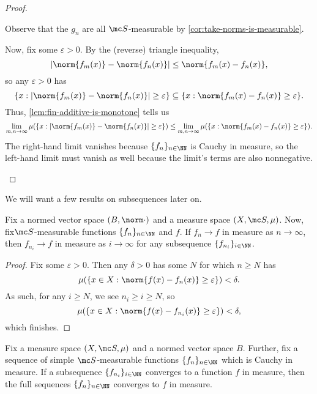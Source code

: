 \documentclass[../notes.tex]{subfiles}
\begin{document}
\begin{proof}
\begin{listalph}
		\item Observe that the $g_n$ are all $\mc S$-measurable by \autoref{cor:take-norms-is-measurable}.

		Now, fix some $\varepsilon>0$. By the (reverse) triangle inequality,
		\[|\norm{f_m(x)}-\norm{f_n(x)}|\le\norm{f_m(x)-f_n(x)},\]
		so any $\varepsilon>0$ has
		\[\{x:|\norm{f_m(x)}-\norm{f_n(x)}|\ge\varepsilon\}\subseteq\{x:\norm{f_m(x)-f_n(x)}\ge\varepsilon\}.\]
		Thus, \autoref{lem:fin-additive-is-monotone} tells us
		\[\lim_{m,n\to\infty}\mu(\{x:|\norm{f_m(x)}-\norm{f_n(x)}|\ge\varepsilon\})\le\lim_{m,n\to\infty}\mu(\{x:\norm{f_m(x)-f_n(x)}\ge\varepsilon\}).\]
		The right-hand limit vanishes because $\{f_n\}_{n\in\NN}$ is Cauchy in measure, so the left-hand limit must vanish as well because the limit's terms are also nonnegative.
		\qedhere
	\end{listalph}
\end{proof}
We will want a few results on subsequences later on.
\begin{lemma} \label{lem:in-measure-subsequence}
	Fix a normed vector space $(B,\norm\cdot)$ and a measure space $(X,\mc S,\mu)$. Now, fix$\mc S$-measurable functions $\{f_n\}_{n\in\NN}$ and $f$. If $f_n\to f$ in measure as $n\to\infty$, then $f_{n_i}\to f$ in measure as $i\to\infty$ for any subsequence $\{f_{n_i}\}_{i\in\NN}$.
\end{lemma}
\begin{proof}
	Fix some $\varepsilon>0$. Then any $\delta>0$ has some $N$ for which $n\ge N$ has
	\[\mu(\{x\in X:\norm{f(x)-f_n(x)}\ge\varepsilon\})<\delta.\]
	As such, for any $i\ge N$, we see $n_i\ge i\ge N$, so
	\[\mu(\{x\in X:\norm{f(x)-f_{n_i}(x)}\ge\varepsilon\})<\delta,\]
	which finishes.
\end{proof}
\begin{lemma} \label{lem:subsequence-has-same-limit-in-measure}
	Fix a measure space $(X,\mc S,\mu)$ and a normed vector space $B$. Further, fix a sequence of simple $\mc S$-measurable functions $\{f_n\}_{n\in\NN}$ which is Cauchy in measure. If a subsequence $\{f_{n_i}\}_{i\in\NN}$ converges to a function $f$ in measure, then the full sequences $\{f_n\}_{n\in\NN}$ converges to $f$ in measure.
\end{lemma}
\end{document}
